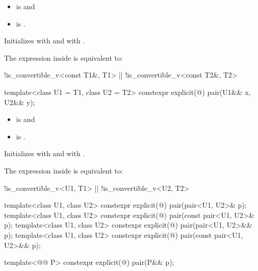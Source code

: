 \documentclass{wg21}
\begin{document}
\begin{itemdescr}
    \pnum
    \constraints
    \begin{itemize}
        \item {} is  and
        \item {} is .
    \end{itemize}

    \pnum
    \effects
    Initializes  with  and  with .

    \pnum
    \remarks
    The expression inside  is equivalent to:
    \begin{codeblock}
        !is_convertible_v<const T1&, T1> || !is_convertible_v<const T2&, T2>
    \end{codeblock}
\end{itemdescr}

%
\begin{itemdecl}
    template<class U1 = T1, class U2 = T2> constexpr explicit(@\seebelow@) pair(U1&& x, U2&& y);
\end{itemdecl}

\begin{itemdescr}
    \pnum
    \constraints
    \begin{itemize}
        \item {} is  and
        \item {} is .
    \end{itemize}

    \pnum
    \effects
    Initializes  with
     and 
    with .

    \pnum
    \remarks
    The expression inside  is equivalent to:
    \begin{codeblock}
        !is_convertible_v<U1, T1> || !is_convertible_v<U2, T2>
    \end{codeblock}
\end{itemdescr}

%
\begin{itemdecl}
    template<class U1, class U2> constexpr explicit(@\seebelow@) pair(pair<U1, U2>& p);
    template<class U1, class U2> constexpr explicit(@\seebelow@) pair(const pair<U1, U2>& p);
    template<class U1, class U2> constexpr explicit(@\seebelow@) pair(pair<U1, U2>&& p);
    template<class U1, class U2> constexpr explicit(@\seebelow@) pair(const pair<U1, U2>&& p); \end{itemdecl}\begin{addedblock}\begin{itemdecl}
    template<@@ P> constexpr explicit(@\seebelow@) pair(P&& p);\end{itemdecl}
\end{addedblock}
\end{document}
